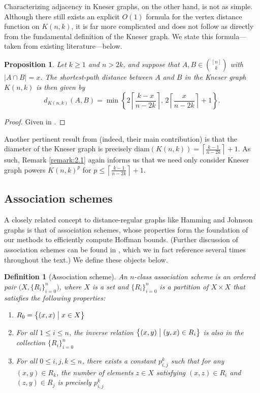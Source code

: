 \documentclass{article}
\numberwithin{equation}{section}
\theoremstyle{plain}
\newtheorem{proposition}[theorem]{Proposition}
\newtheorem{definition}{Definition}
\begin{document}
Characterizing adjacency in Kneser graphs, on the other hand, is not as simple. Although there still exists an explicit $O(1)$ formula for the vertex distance function on $K(n, k)$, it is far more complicated and does not follow as directly from the fundamental definition of the Kneser graph. We state this formula---taken from existing literature---below.

\begin{proposition}\label{prop:2.4}
    Let $k \ge 1$ and $n > 2k$, and suppose that $A, B \in \binom{[n]}{k}$ with $\lvert A \cap B \rvert = x$. The shortest-path distance between $A$ and $B$ in the Kneser graph $K(n, k)$ is then given by
    \[d_{K(n, k)}(A, B) = \min\left\{2{\left\lceil\frac{k - x}{n - 2k}\right\rceil},\, 2{\left\lceil\frac{x}{n - 2k}\right\rceil} + 1\right\}.\]
\end{proposition}

\begin{proof}
    Given in \cite{VPV05}.
\end{proof}

Another pertinent result from \cite{VPV05} (indeed, their main contribution) is that the diameter of the Kneser graph is precisely $\mathrm{diam}(K(n, k)) = \left\lceil\frac{k - 1}{n - 2k}\right\rceil + 1$. As such, Remark \ref{remark:2.1} again informs us that we need only consider Kneser graph powers $K(n, k)^p$ for $p \le \left\lceil\frac{k - 1}{n - 2k}\right\rceil + 1$.

\subsection{Association schemes}\label{subsection:2.3}

A closely related concept to distance-regular graphs like Hamming and Johnson graphs is that of association schemes, whose properties form the foundation of our methods to efficiently compute Hoffman bounds. (Further discussion of association schemes can be found in \cite{BI84}, which we in fact reference several times throughout the text.) We define these objects below.

\begin{definition}[Association scheme]\label{defn:7}
    An $n$-class association scheme is an ordered pair $\bigl(X, \{R_i\}_{i = 0}^n\bigr)$, where $X$ is a set and $\{R_i\}_{i = 0}^n$ is a partition of $X \times X$ that satisfies the following properties:
    \begin{enumerate}[label=(\roman*)]
        \item $R_0 = \bigl\{(x, x) \bigm| x \in X\bigr\}$
        \item For all $1 \le i \le n$, the inverse relation $\bigl\{(x, y) \bigm| (y, x) \in R_i\bigr\}$ is also in the collection $\{R_i\}_{i = 0}^n$
        \item For all $0 \le i, j, k \le n$, there exists a constant $p_{i,j}^k$ such that for any $(x, y) \in R_k$, the number of elements $z \in X$ satisfying $(x, z) \in R_i$ and $(z, y) \in R_j$ is precisely $p_{i,j}^k$
    \end{enumerate}
\end{definition}
\end{document}
